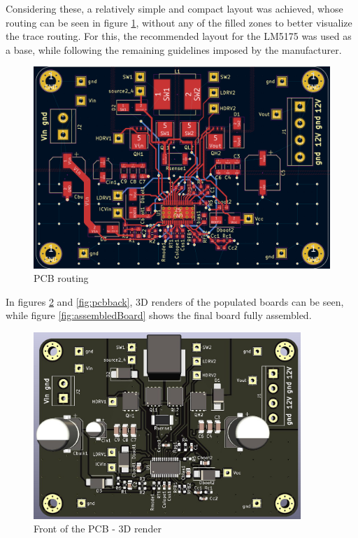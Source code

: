 \documentclass[11pt, a4paper]{article}
\begin{document}
Considering these, a relatively simple and compact layout was achieved, whose routing can be seen in figure \ref{fig:pcbrouting}, without any of the filled zones to better visualize the trace routing. For this, the recommended layout for the LM5175 \cite{lm7175data} was used as a base, while following the remaining guidelines imposed by the manufacturer.

\begin{figure}[H]
    \centering
    \includegraphics[width=\textwidth]{./figures/pcbLayers.png}
    \caption{PCB routing}
    \label{fig:pcbrouting}
\end{figure}

\newpage

In figures \ref{fig:pcbfront} and \ref{fig:pcbback}, 3D renders of the populated boards can be seen, while figure \ref{fig:assembledBoard} shows the final board fully assembled.

\begin{figure}[H]
    \centering
    \includegraphics[width=0.9\textwidth]{./figures/pcbFront.jpg}
    \caption{Front of the PCB - 3D render}
    \label{fig:pcbfront}
\end{figure}
\end{document}
